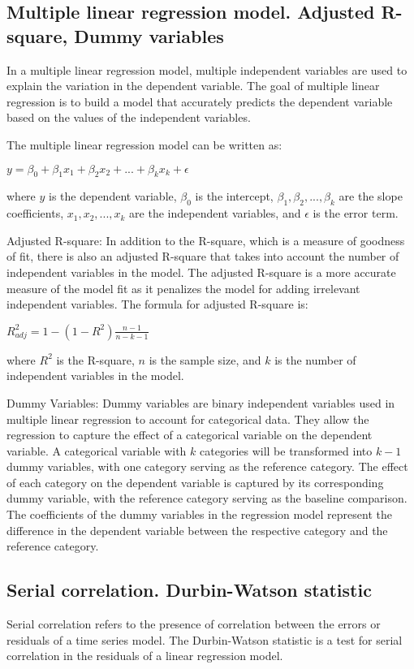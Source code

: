 \documentclass[12pt, a4paper, oneside]{article}
\begin{document}
\subsection{ Multiple linear regression model. Adjusted R-square, Dummy variables }
In a multiple linear regression model, multiple independent variables are used to explain the variation in the dependent variable. The goal of multiple linear regression is to build a model that accurately predicts the dependent variable based on the values of the independent variables.

The multiple linear regression model can be written as:

$y = \beta_0 + \beta_1x_1 + \beta_2x_2 + ... + \beta_kx_k + \epsilon$

where $y$ is the dependent variable, $\beta_0$ is the intercept, $\beta_1, \beta_2, ..., \beta_k$ are the slope coefficients, $x_1, x_2, ..., x_k$ are the independent variables, and $\epsilon$ is the error term.

Adjusted R-square: In addition to the R-square, which is a measure of goodness of fit, there is also an adjusted R-square that takes into account the number of independent variables in the model. The adjusted R-square is a more accurate measure of the model fit as it penalizes the model for adding irrelevant independent variables. The formula for adjusted R-square is:

$R_{adj}^2 = 1 - (1 - R^2) \frac{n - 1}{n - k - 1}$

where $R^2$ is the R-square, $n$ is the sample size, and $k$ is the number of independent variables in the model.

Dummy Variables: Dummy variables are binary independent variables used in multiple linear regression to account for categorical data. They allow the regression to capture the effect of a categorical variable on the dependent variable. A categorical variable with $k$ categories will be transformed into $k-1$ dummy variables, with one category serving as the reference category. The effect of each category on the dependent variable is captured by its corresponding dummy variable, with the reference category serving as the baseline comparison. The coefficients of the dummy variables in the regression model represent the difference in the dependent variable between the respective category and the reference category.

\subsection{ Serial correlation. Durbin-Watson statistic }
Serial correlation refers to the presence of correlation between the errors or residuals of a time series model. The Durbin-Watson statistic is a test for serial correlation in the residuals of a linear regression model.
\end{document}
